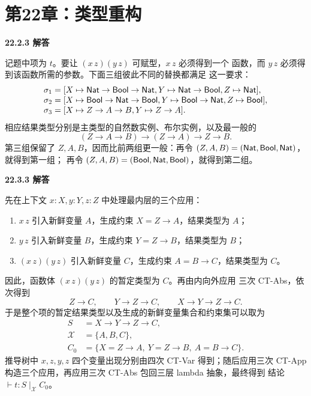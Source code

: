 \newpage
\section*{第22章：类型重构}

\begin{taplsolutionentrybox}
\label{sol:translator:22.2.3}
\textbf{22.2.3 解答}

记题中项为 \(t\)。要让 \((x\,z)(y\,z)\) 可赋型，\(x\,z\) 必须得到一个
函数，而 \(y\,z\) 必须得到该函数所需的参数。下面三组彼此不同的替换都满足
这一要求：
\[
\begin{array}{l}
\sigma_1=[X\mapsto\mathsf{Nat}\to\mathsf{Bool}\to\mathsf{Nat},
Y\mapsto\mathsf{Nat}\to\mathsf{Bool},Z\mapsto\mathsf{Nat}],\\
\sigma_2=[X\mapsto\mathsf{Bool}\to\mathsf{Nat}\to\mathsf{Bool},
Y\mapsto\mathsf{Bool}\to\mathsf{Nat},Z\mapsto\mathsf{Bool}],\\
\sigma_3=[X\mapsto Z\to A\to B,Y\mapsto Z\to A].
\end{array}
\]
相应结果类型分别是主类型的自然数实例、布尔实例，以及最一般的
\[
(Z\to A\to B)\to(Z\to A)\to Z\to B.
\]
第三组保留了 \(Z,A,B\)，因而比前两组更一般：再令
\((Z,A,B)=(\mathsf{Nat},\mathsf{Bool},\mathsf{Nat})\)，就得到第一组；
再令 \((Z,A,B)=(\mathsf{Bool},\mathsf{Nat},\mathsf{Bool})\)，就得到第二组。

\end{taplsolutionentrybox}

\begin{taplsolutionentrybox}
\label{sol:translator:22.3.3}
\textbf{22.3.3 解答}

先在上下文 \(x:X,y:Y,z:Z\) 中处理最内层的三个应用：
\begin{enumerate}
  \item \(x\,z\) 引入新鲜变量 \(A\)，生成约束 \(X=Z\to A\)，结果类型为 \(A\)；
  \item \(y\,z\) 引入新鲜变量 \(B\)，生成约束 \(Y=Z\to B\)，结果类型为 \(B\)；
  \item \((x\,z)(y\,z)\) 引入新鲜变量 \(C\)，生成约束 \(A=B\to C\)，结果类型为 \(C\)。
\end{enumerate}
因此，函数体 \((x\,z)(y\,z)\) 的暂定类型为 \(C\)。再由内向外应用
三次 CT-Abs，依次得到
\[
Z\to C,
\qquad Y\to Z\to C,
\qquad X\to Y\to Z\to C.
\]
于是整个项的暂定结果类型以及生成的新鲜变量集合和约束集可以取为
\[
\begin{aligned}
S&=X\to Y\to Z\to C,\\
\mathcal X&=\{A,B,C\},\\
C_0&=\{X=Z\to A,\ Y=Z\to B,\ A=B\to C\}.
\end{aligned}
\]
推导树中 \(x,z,y,z\) 四个变量出现分别由四次 CT-Var 得到；随后应用三次
CT-App 构造三个应用，再应用三次 CT-Abs 包回三层 lambda 抽象，最终得到
结论 \(\vdash t:S\mid_{\mathcal X}C_0\)。

\end{taplsolutionentrybox}


